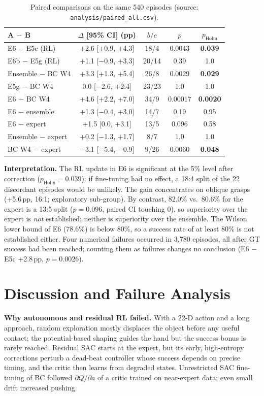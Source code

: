 \documentclass[conference,10pt]{IEEEtran}
\newcommand{\pp}{\,pp}
\begin{document}
\begin{table}[t]
\caption{Paired comparisons on the same 540 episodes (source: \texttt{analysis/paired\_all.csv}).}
\label{tab:paired}
\centering\footnotesize
\setlength{\tabcolsep}{2.6pt}
\begin{tabular}{@{}lcccc@{}}
\toprule
A $-$ B & $\Delta$ [95\% CI] (pp) & $b/c$ & $p$ & $p_{\text{Holm}}$\\
\midrule
E6 $-$ E5c (RL) & +2.6 [+0.9, +4.3] & 18/4 & 0.0043 & \textbf{0.039}\\
E6b $-$ E5g (RL) & +1.1 [$-$0.9, +3.3] & 20/14 & 0.39 & 1.0\\
Ensemble $-$ BC W4 & +3.3 [+1.3, +5.4] & 26/8 & 0.0029 & \textbf{0.029}\\
E5g $-$ BC W4 & 0.0 [$-$2.6, +2.4] & 23/23 & 1.0 & 1.0\\
E6 $-$ BC W4 & +4.6 [+2.2, +7.0] & 34/9 & 0.00017 & \textbf{0.0020}\\
E6 $-$ ensemble & +1.3 [$-$0.4, +3.0] & 14/7 & 0.19 & 0.95\\
E6 $-$ expert & +1.5 [0.0, +3.1] & 13/5 & 0.096 & 0.58\\
Ensemble $-$ expert & +0.2 [$-$1.3, +1.7] & 8/7 & 1.0 & 1.0\\
BC W4 $-$ expert & $-$3.1 [$-$5.4, $-$0.9] & 9/26 & 0.0060 & \textbf{0.048}\\
\bottomrule
\end{tabular}
\end{table}

\textbf{Interpretation.} The RL update in E6 is significant at the 5\% level after correction ($p_{\text{Holm}}=0.039$): if
fine-tuning had no effect, a 18:4 split of the 22 discordant episodes would be unlikely. The gain concentrates on oblique
grasps (+5.6\pp, 16:1; exploratory sub-group). By contrast, 82.0\% vs.\ 80.6\% for the expert is a 13:5 split
($p=0.096$, paired CI touching 0), so superiority over the expert is \emph{not} established; neither is superiority over the
ensemble. The Wilson lower bound of E6 (78.6\%) is below 80\%, so a success rate of at least 80\% is not established either.
Four numerical failures occurred in 3{,}780 episodes, all after GT success had been reached; counting them as failures changes
no conclusion (E6 $-$ E5c +2.8\pp, $p=0.0026$).

\section{Discussion and Failure Analysis}\label{sec:discussion}
\textbf{Why autonomous and residual RL failed.} With a 22-D action and a long approach, random exploration mostly displaces the
object before any useful contact; the potential-based shaping guides the hand but the success bonus is rarely reached. Residual
SAC starts at the expert, but its early, high-entropy corrections perturb a dead-beat controller whose success depends on
precise timing, and the critic then learns from degraded states. Unrestricted SAC fine-tuning of BC followed $\partial Q/\partial a$
of a critic trained on near-expert data; even small drift increased pushing.
\end{document}

